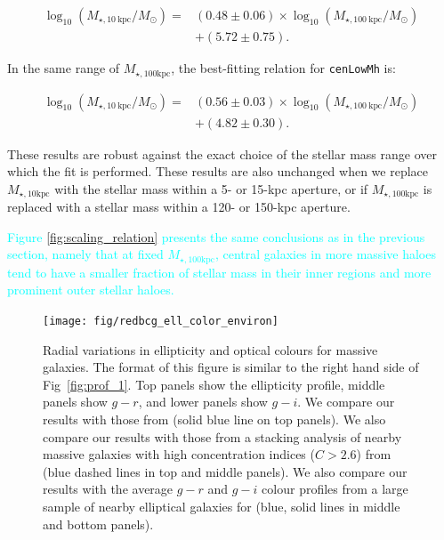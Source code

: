 \documentclass[a4paper,fleqn,usenatbib]{mnras}
\def\nbcg{\texttt{cenLowMh}}
\def\minn{{$M_{\star,10\mathrm{kpc}}$}}
\def\mtot{{$M_{\star,100\mathrm{kpc}}$}}
\newcommand{\song}[1]{\textcolor{cyan}{#1}}
\begin{document}
    \begin{equation}
        \begin{aligned}
        \log_{10} (M_{\star, 10\ \mathrm{kpc}}/M_{\odot}) = & (0.48\pm0.06) \times \log_{10} (M_{\star, 100\ \mathrm{kpc}}/M_{\odot}) \\ & +(5.72\pm0.75).
        \end{aligned}
    \end{equation}
    
    \noindent In the same range of \mtot{}, the best-fitting relation for \nbcg{} is:
     
    \begin{equation}
        \begin{aligned}
        \log_{10} (M_{\star, 10\ \mathrm{kpc}}/M_{\odot}) = & (0.56\pm0.03) \times \log_{10} (M_{\star, 100\ \mathrm{kpc}}/M_{\odot}) \\ & +(4.82\pm0.30).
        \end{aligned}
    \end{equation}
    
    These results are robust against the exact choice of the stellar mass range over 
    which the fit is performed.
    These results are also unchanged when we replace \minn{} with the stellar 
    mass within a 5- or 15-kpc aperture, or if \mtot{} is replaced with a stellar mass 
    within a 120- or 150-kpc aperture.  
    
    \song{
    Figure \ref{fig:scaling_relation} presents the same conclusions as in the previous 
    section, namely that at fixed \mtot{}, central galaxies in more massive haloes tend 
    to have a smaller fraction of stellar mass in their inner regions and more prominent 
    outer stellar haloes.  
    }
   

  \begin{figure}
      \centering 
      \texttt{[image: fig/redbcg\_ell\_color\_environ]}
      \caption{
          Radial variations in ellipticity and optical colours for massive galaxies. 
          The format of this figure is similar to the right hand side of 
          Fig~\ref{fig:prof_1}. 
          Top panels show the ellipticity profile, middle panels show $g-r$, and lower 
          panels show $g-i$. 
          We compare our results with those from \citet{Tal2011}
          (solid blue line on top panels). 
          We also compare our results with those from a stacking analysis of nearby 
          massive galaxies with high concentration indices ($C>2.6$) from 
          \citet{DSouza2014} (blue dashed lines in top and middle panels). 
          We also compare our results with the average $g-r$ and $g-i$ colour profiles 
          from a large sample of nearby elliptical galaxies for \citet{LaBarbera2010}
          (blue, solid lines in middle and bottom panels).
          }
      \label{fig:ell_color}
  \end{figure}
\end{document}
